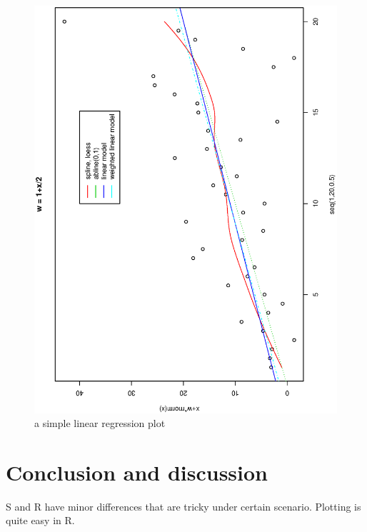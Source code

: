 \documentclass[a4paper,10pt]{article}
\begin{document}
\begin{figure}
\includegraphics[angle=-90, width=1\textwidth]{figures/hw1_fig1.eps}
\caption{a simple linear regression plot}\label{f1}
\end{figure}

\section{Conclusion and discussion}
S and R have minor differences that are tricky under certain scenario. Plotting is quite easy in R.
\end{document}
